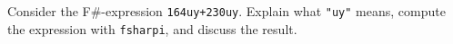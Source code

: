 Consider the F\#-expression \lstinline{164uy+230uy}. Explain what \lstinline{"uy"} means, compute the expression with \lstinline[language=console]{fsharpi}, and discuss the result.